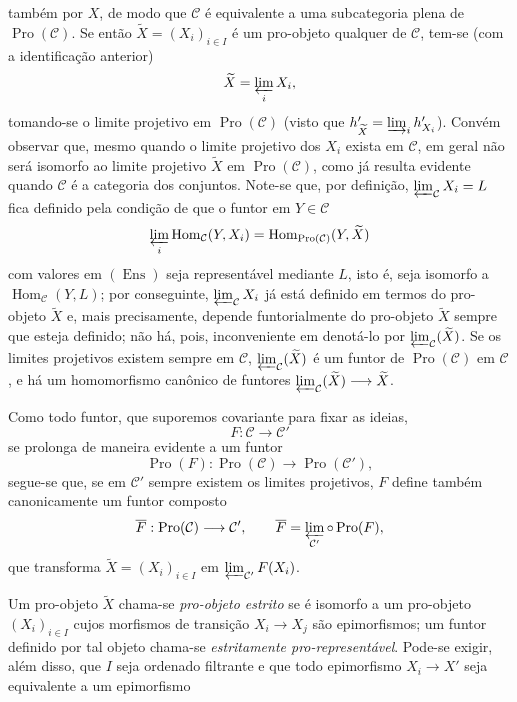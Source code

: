 também por $X$, de modo que $\mathcal C$ é equivalente a uma subcategoria
plena de $\operatorname{Pro}(\mathcal C)$. Se então
$\widetilde X=(X_i)_{i\in I}$ é um pro-objeto qualquer de $\mathcal C$, tem-se
(com a identificação anterior)
\[
  \widetilde X=\varprojlim_i X_i,
\]
tomando-se o limite projetivo em $\operatorname{Pro}(\mathcal C)$
(visto que $h'_{\widetilde X}=\varinjlim_i h'_{X_i}$). Convém observar que,
mesmo quando o limite projetivo dos $X_i$ exista em $\mathcal C$, em
geral não será isomorfo ao limite projetivo $\widetilde X$ em
$\operatorname{Pro}(\mathcal C)$, como já resulta evidente quando $\mathcal C$
é a categoria dos conjuntos. Note-se que, por definição,
$\varprojlim_{\mathcal C}X_i=L$ fica definido pela condição de que o
funtor em $Y\in\mathcal C$
\[
  \varprojlim_i\operatorname{Hom}_{\mathcal C}(Y,X_i)
  =\operatorname{Hom}_{\operatorname{Pro}(\mathcal C)}(Y,\widetilde X)
\]
com valores em $(\operatorname{Ens})$ seja representável mediante $L$, isto é,
seja isomorfo a $\operatorname{Hom}_{\mathcal C}(Y,L)$; por conseguinte,
$\varprojlim_{\mathcal C}X_i$ já está definido em termos do pro-objeto
$\widetilde X$ e, mais precisamente, depende funtorialmente do pro-objeto
$\widetilde X$ sempre que esteja definido; não há, pois, inconveniente em
denotá-lo por $\varprojlim_{\mathcal C}(\widetilde X)$. Se os limites
projetivos existem sempre em $\mathcal C$,
$\varprojlim_{\mathcal C}(\widetilde X)$ é um funtor de
$\operatorname{Pro}(\mathcal C)$ em $\mathcal C$, e há um homomorfismo
canônico de funtores
$\varprojlim_{\mathcal C}(\widetilde X)\longrightarrow\widetilde X$.

Como todo funtor, que suporemos covariante para fixar as ideias,
\[
  F:\mathcal C\longrightarrow\mathcal C'
\]
se prolonga de maneira evidente a um funtor
\[
  \operatorname{Pro}(F):\operatorname{Pro}(\mathcal C)
  \longrightarrow\operatorname{Pro}(\mathcal C'),
\]
segue-se que, se em $\mathcal C'$ sempre existem os limites projetivos, $F$
define também canonicamente um funtor composto
\[
  \overline F:\operatorname{Pro}(\mathcal C)\longrightarrow\mathcal C',
  \qquad
  \overline F=\varprojlim_{\mathcal C'}\circ\operatorname{Pro}(F),
\]
que transforma $\widetilde X=(X_i)_{i\in I}$ em
$\varprojlim_{\mathcal C'}F(X_i)$.

Um pro-objeto $\widetilde X$ chama-se \emph{pro-objeto estrito} se é isomorfo a
um pro-objeto $(X_i)_{i\in I}$ cujos morfismos de transição
$X_i\longrightarrow X_j$ são epimorfismos; um funtor definido por tal objeto
chama-se \emph{estritamente pro-representável}. Pode-se exigir, além disso, que $I$
seja ordenado filtrante e que todo epimorfismo $X_i\longrightarrow X'$ seja
equivalente a um epimorfismo


